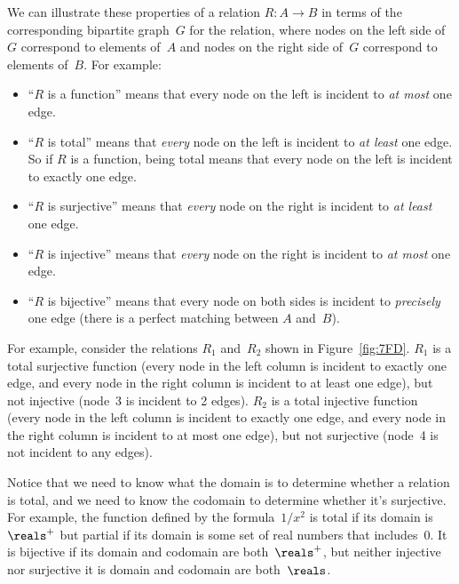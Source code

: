 We can illustrate these properties of a relation $R: A \to B$ in terms
of the corresponding bipartite graph~$G$ for the relation, where nodes
on the left side of~$G$ correspond to elements of~$A$ and nodes on the
right side of~$G$ correspond to elements of~$B$.  For example:
\begin{itemize}

\item
``$R$ is a function'' means that every node on the left is incident to
  \emph{at most} one edge.

\item
``$R$ is total'' means that \emph{every} node on the left is incident
  to \emph{at least} one edge.  So if $R$ is a function, being total
  means that every node on the left is incident to exactly one edge.

\item
``$R$ is surjective'' means that \emph{every} node on the right is
  incident to \emph{at least} one edge.

\item
``$R$ is injective'' means that \emph{every} node on the right is
  incident to \emph{at most} one edge.

\item
``$R$ is bijective'' means that every node on both sides is incident
  to \emph{precisely} one edge (\ie there is a perfect matching
  between $A$ and~$B$).

\end{itemize}

For example, consider the relations $R_1$ and~$R_2$ shown in
Figure~\ref{fig:7FD}. $R_1$ is a total surjective function (every node
in the left column is incident to exactly one edge, and every node in
the right column is incident to at least one edge), but not injective
(node~3 is incident to 2 edges).  $R_2$ is a total injective function
(every node in the left column is incident to exactly one edge, and
every node in the right column is incident to at most one edge), but
not surjective (node~4 is not incident to any edges).

Notice that we need to know what the domain is to determine whether a
relation is total, and we need to know the codomain to determine
whether it's surjective.  For example, the function defined by the
formula~$1/x^2$ is total if its domain is~$\reals^+$ but partial if its
domain is some set of real numbers that includes~0.  It is bijective
if its domain and codomain are both~$\reals^+$, but neither injective
nor surjective it is domain and codomain are both~$\reals$.

